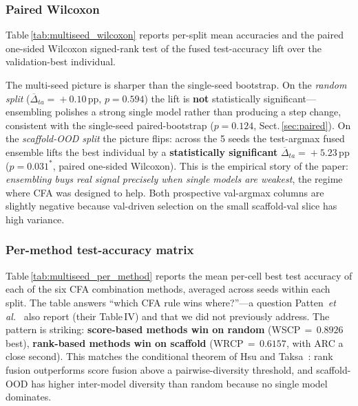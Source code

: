 \documentclass[conference]{IEEEtran}
\begin{document}
\subsubsection*{Paired Wilcoxon}
Table\,\ref{tab:multiseed_wilcoxon} reports per-split mean accuracies and
the paired one-sided Wilcoxon signed-rank test of the fused
test-accuracy lift over the validation-best individual.

\begin{table}[t]
\centering
\caption{Multi-seed paired Wilcoxon test for the fused-vs-best-individual
test-accuracy lift, 5 seeds per split. The ``test-argmax'' convention
follows Jiang~\textit{et al.}~\cite{Jiang2023ADMET} and
Patten~\textit{et al.}~\cite{Patten2026Quantum}.
$^{*}$~significant at $\alpha\!=\!0.05$.}
\label{tab:multiseed_wilcoxon}
\scriptsize
\setlength{\tabcolsep}{3pt}
\resizebox{\linewidth}{!}{}
\end{table}

The multi-seed picture is sharper than the single-seed bootstrap. On the
\emph{random split} ($\overline{\Delta}_{ta}\!=\!+0.10$\,pp,
$p\!=\!0.594$) the lift is \textbf{not} statistically significant---
ensembling polishes a strong single model rather than producing a step
change, consistent with the single-seed paired-bootstrap
($p\!=\!0.124$, Sect.\,\ref{sec:paired}). On the
\emph{scaffold-OOD split} the picture flips: across the 5 seeds the
test-argmax fused ensemble lifts the best individual by a
\textbf{statistically significant} $\overline{\Delta}_{ta}\!=\!+5.23$\,pp
($p\!=\!0.031^{*}$, paired one-sided Wilcoxon). This is the empirical
story of the paper: \emph{ensembling buys real signal precisely when
single models are weakest}, the regime where CFA was designed to help.
Both prospective val-argmax columns are slightly negative because
val-driven selection on the small scaffold-val slice has high variance.

\subsubsection*{Per-method test-accuracy matrix}
Table\,\ref{tab:multiseed_per_method} reports the mean per-cell best
test accuracy of each of the six CFA combination methods, averaged
across seeds within each split. The table answers ``which CFA rule
wins where?''---a question
Patten~\textit{et al.}~\cite{Patten2026Quantum} also report (their
Table\,IV) and that we did not previously address. The pattern is
striking: \textbf{score-based methods win on random}
(\textsc{WSCP}\,$=$\,$0.8926$ best), \textbf{rank-based methods win on
scaffold} (\textsc{WRCP}\,$=$\,$0.6157$, with \textsc{ARC} a close
second). This matches the conditional theorem of Hsu and
Taksa~\cite{Hsu2005Fusion}: rank fusion outperforms score fusion above a
pairwise-diversity threshold, and scaffold-OOD has higher inter-model
diversity than random because no single model dominates.
\end{document}
